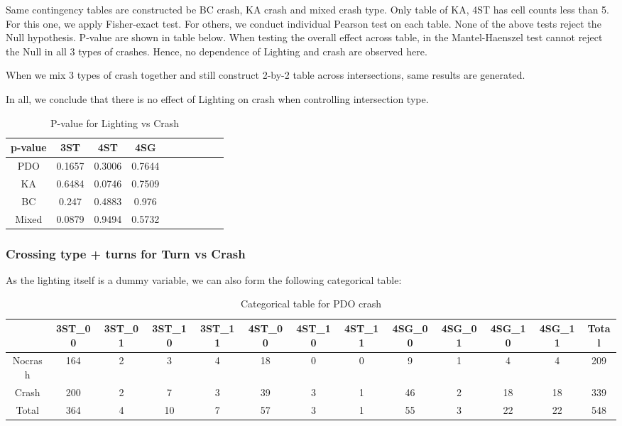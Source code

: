 \documentclass[11pt]{scrartcl} %
\begin{document}
Same contingency tables are constructed be BC crash, KA crash and mixed crash type. Only table of KA, 4ST has cell counts less than 5. For this one, we apply Fisher-exact test. For others, we conduct individual Pearson test on each table. None of the above tests reject the Null hypothesis. P-value are shown in table below. When testing the overall effect across table, in the Mantel-Haenszel test cannot reject the Null in all 3 types of crashes. Hence, no dependence of Lighting and crash are observed here.

When we mix 3 types of crash together and still construct 2-by-2 table across intersections, same results are generated.

In all, we conclude that there is no effect of Lighting on crash when controlling intersection type.

\begin{table}[H]
\caption{P-value for Lighting vs Crash}
\centering
\begin{tabular}{|c|c|c|c|c|c|c|c|c|c|}
\hline
p-value & 3ST & 4ST & 4SG  \\
\hline
PDO & 0.1657 & 0.3006 & 0.7644 \\
\hline
KA & 0.6484 & 0.0746 & 0.7509\\
\hline
BC & 0.247  & 0.4883 & 0.976 \\
\hline
Mixed & 0.0879 & 0.9494 & 0.5732 \\
\hline
\end{tabular}
\end{table}


\subsubsection{Crossing type + turns for Turn vs Crash}

As the lighting itself is a dummy variable, we can also form the following categorical table:

\begin{table}[H]
\caption{Categorical table for PDO crash}
\centering
\tiny
\begin{tabular}{|c|c|c|c|c|c|c|c|c|c|c|c|c|}
\hline
      & 3ST\_00 & 3ST\_01 & 3ST\_10 & 3ST\_11 & 4ST\_00 & 4ST\_10 & 4ST\_11 & 4SG\_00 & 4SG\_01 & 4SG\_10 & 4SG\_11 & Total \\
\hline
Nocrash & 164  & 2 & 3 & 4 & 18 & 0 & 0 & 9 & 1 & 4 & 4 & 209\\
\hline
Crash   & 200  & 2 & 7 & 3 & 39 & 3 & 1 & 46 & 2 & 18 & 18 & 339 \\
\hline
Total   & 364  & 4 & 10 & 7 & 57 & 3 & 1 & 55 & 3 & 22 & 22 & 548\\
\hline
\end{tabular}
\end{table}
\end{document}
